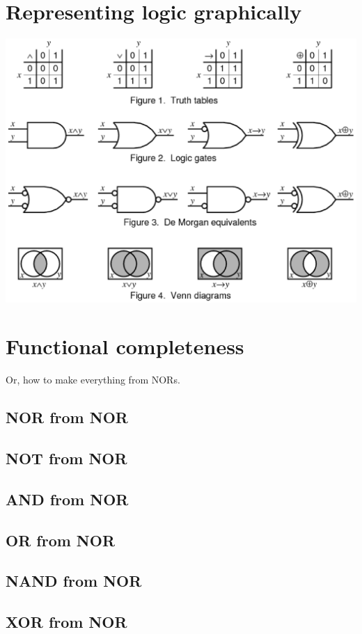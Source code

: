 \documentclass[11pt]{book}
\begin{document}
\section{Representing logic graphically}
\begin{center}
	\includegraphics[width = \textwidth]{figures/20.08.png}
\end{center}

\section{Functional completeness}
Or, how to make everything from NORs.
\subsection{NOR from NOR}
\subsection{NOT from NOR}
\subsection{AND from NOR}
\subsection{OR from NOR}
\subsection{NAND from NOR}
\subsection{XOR from NOR}
\end{document}
